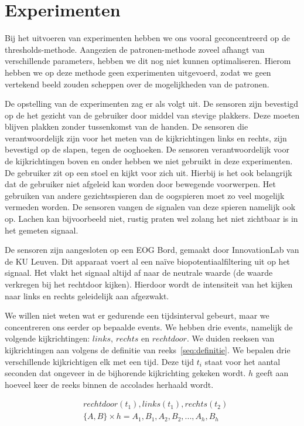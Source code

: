 \documentclass{article}
\begin{document}
\section{Experimenten}

Bij het uitvoeren van experimenten hebben we ons vooral geconcentreerd op de thresholds-methode. Aangezien de patronen-methode zoveel afhangt van verschillende parameters, hebben we dit nog niet kunnen optimaliseren. Hierom hebben we op deze methode geen experimenten uitgevoerd, zodat we geen vertekend beeld zouden scheppen over de mogelijkheden van de patronen.

De opstelling van de experimenten zag er als volgt uit. De sensoren zijn bevestigd op de het gezicht van de gebruiker door middel van stevige plakkers. Deze moeten blijven plakken zonder tussenkomst van de handen. De sensoren die verantwoordelijk zijn voor het meten van de kijkrichtingen links en rechts, zijn bevestigd op de slapen, tegen de ooghoeken. De sensoren verantwoordelijk voor de kijkrichtingen boven en onder hebben we niet gebruikt in deze experimenten. De gebruiker zit op een stoel en kijkt voor zich uit. Hierbij is het ook belangrijk dat de gebruiker niet afgeleid kan worden door bewegende voorwerpen. Het gebruiken van andere gezichtsspieren dan de oogspieren moet zo veel mogelijk vermeden worden. De sensoren vangen de signalen van deze spieren namelijk ook op. Lachen kan bijvoorbeeld niet, rustig praten wel zolang het niet zichtbaar is in het gemeten signaal.

De sensoren zijn aangesloten op een EOG Bord, gemaakt door InnovationLab van de KU Leuven. Dit apparaat voert al een naïve biopotentiaalfiltering uit op het signaal. Het vlakt het signaal altijd af naar de neutrale waarde (de waarde verkregen bij het rechtdoor kijken). Hierdoor wordt de intensiteit van het kijken naar links en rechts geleidelijk aan afgezwakt.

We willen niet weten wat er gedurende een tijdsinterval gebeurt, maar we concentreren ons eerder op bepaalde events. We hebben drie events, namelijk de volgende kijkrichtingen: $links$, $rechts$ en $rechtdoor$. We duiden reeksen van kijkrichtingen aan volgens de definitie van reeks~\ref{seq:definitie}. We bepalen drie verschillende kijkrichtigen elk met een tijd. Deze tijd $t_i$ staat voor het aantal seconden dat ongeveer in de bijhorende kijkrichting gekeken wordt. $h$ geeft aan hoeveel keer de reeks binnen de accolades herhaald wordt.

\begin{equation}
\label{seq:definitie}
\begin{aligned}
& rechtdoor(t_1),  links (t_1), rechts (t_2) \\
& \{ A, B\} \times h = A_1, B_1, A_2, B_2, ... , A_h, B_h
\end{aligned}
\end{equation}
\end{document}

